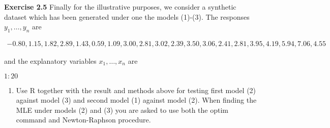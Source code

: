 



\textbf{Exercise 2.5}
Finally for the illustrative purposes, we consider a synthetic dataset which has been generated under one the models (1)-(3). The responses $y_1, \ldots, y_n$ are

\begin{align*}
-0.80, 1.15, 1.82, 2.89, 1.43, 0.59, 1.09, 3.00, 2.81, 3.02, 2.39, 3.50, 3.06, 2.41, 2.81, 3.95, 4.19, 5.94, 7.06, 4.55
\end{align*}

and the explanatory variables $x_1, \ldots, x_n$ are

$1:20$

\begin{enumerate}
    \item Use R together with the result and methods above for testing first model (2) against model (3) and second model (1) against model (2). When finding the MLE under models (2) and (3) you are asked to use both the optim command and Newton-Raphson procedure. 
\end{enumerate}

